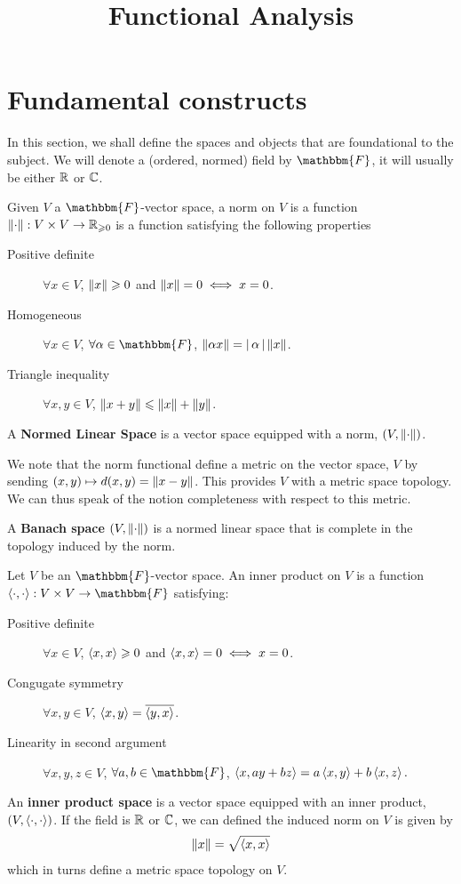 \documentclass{article}
\title{Functional Analysis}
\date{}
\begin{document}
\maketitle 
\section{Fundamental constructs} 
In this section, we shall define the spaces and objects that are foundational to the subject. We will denote a (ordered, normed) field by $\mathbbm{F}$, it will usually be either $\R$ or $\C$. 

\begin{fdefinition} Given $V$ a $\mathbbm{F}$-vector space, a norm on $V$ is a function $\norm : V \times V \to \R_{\geq 0}$ is a function satisfying the following properties
\begin{description}
\item[Positive definite] $\forall x \in V$, $\norm[x] \geq 0 $ and $ \norm[x] = 0 \iff x = 0$. 
\item[Homogeneous] $\forall x \in V$, $\forall \alpha \in \mathbbm{F}$, $\norm[\alpha x] = \abs{\alpha} \norm[x]$. 
\item[Triangle inequality] $\forall x, y \in V$, $\norm[x + y] \leq \norm[x] + \norm[y]$. 
\end{description}
A \textbf{Normed Linear Space} is a vector space equipped with a norm,  $(V, \norm)$. 
\end{fdefinition}
We note that the norm functional define a metric on the vector space, $V$ by sending $(x, y) \mapsto d(x, y) = \norm[x-y]$. This provides $V$ with a metric space topology. We can thus speak of the notion completeness with respect to this metric. 

\begin{fdefinition} A \textbf{Banach space} $(V, \norm)$ is a normed linear space that is complete in the topology induced by the norm. 
\end{fdefinition}

\begin{fdefinition} Let $V$ be an $\mathbbm{F}$-vector space. An inner product on $V$ is a function $\inprod : V \times V \to \mathbbm{F}$ satisfying: 
\begin{description}
\item[Positive definite] $\forall x \in V$, $\inprod[x, x] \geq 0$ and $\inprod[x, x] = 0 \iff x = 0$. 
\item[Congugate symmetry] $\forall x, y \in V$, $\inprod[x, y] = \overline{\inprod[y, x]}$. 
\item[Linearity in second argument] $\forall x, y, z \in V$, $\forall a, b \in \mathbbm{F}$, $\inprod[x, ay + bz] = a \inprod[x, y] + b \inprod[x, z]. $
\end{description}
An \textbf{inner product space} is a vector space equipped with an inner product, $(V, \inprod)$. If the field is $\R$ or $\C$, we can defined the induced norm on $V$ is given by 
\begin{align*}
\norm[x] = \sqrt{\inprod[x, x]}
\end{align*}
which in turns define a metric space topology on $V$. 
\end{fdefinition}
\end{document}

